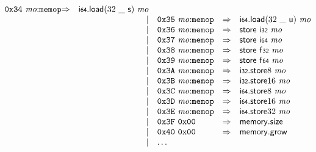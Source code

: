 $$\begin{array}{@{}l@{}rrlll@{}l@{}}
\mathtt{0x34}~{\mathit{mo}}{:}{\mathtt{memop}} &\Rightarrow& {\mathsf{i{\scriptstyle64}}.\mathsf{load}}{(32~\mathsf{\_}~\mathsf{s})}~{\mathit{mo}} \\ &&|&
\mathtt{0x35}~{\mathit{mo}}{:}{\mathtt{memop}} &\Rightarrow& {\mathsf{i{\scriptstyle64}}.\mathsf{load}}{(32~\mathsf{\_}~\mathsf{u})}~{\mathit{mo}} \\ &&|&
\mathtt{0x36}~{\mathit{mo}}{:}{\mathtt{memop}} &\Rightarrow& \mathsf{store}~\mathsf{i{\scriptstyle32}}~{\mathit{mo}} \\ &&|&
\mathtt{0x37}~{\mathit{mo}}{:}{\mathtt{memop}} &\Rightarrow& \mathsf{store}~\mathsf{i{\scriptstyle64}}~{\mathit{mo}} \\ &&|&
\mathtt{0x38}~{\mathit{mo}}{:}{\mathtt{memop}} &\Rightarrow& \mathsf{store}~\mathsf{f{\scriptstyle32}}~{\mathit{mo}} \\ &&|&
\mathtt{0x39}~{\mathit{mo}}{:}{\mathtt{memop}} &\Rightarrow& \mathsf{store}~\mathsf{f{\scriptstyle64}}~{\mathit{mo}} \\ &&|&
\mathtt{0x3A}~{\mathit{mo}}{:}{\mathtt{memop}} &\Rightarrow& {\mathsf{i{\scriptstyle32}}.\mathsf{store}}{8}~{\mathit{mo}} \\ &&|&
\mathtt{0x3B}~{\mathit{mo}}{:}{\mathtt{memop}} &\Rightarrow& {\mathsf{i{\scriptstyle32}}.\mathsf{store}}{16}~{\mathit{mo}} \\ &&|&
\mathtt{0x3C}~{\mathit{mo}}{:}{\mathtt{memop}} &\Rightarrow& {\mathsf{i{\scriptstyle64}}.\mathsf{store}}{8}~{\mathit{mo}} \\ &&|&
\mathtt{0x3D}~{\mathit{mo}}{:}{\mathtt{memop}} &\Rightarrow& {\mathsf{i{\scriptstyle64}}.\mathsf{store}}{16}~{\mathit{mo}} \\ &&|&
\mathtt{0x3E}~{\mathit{mo}}{:}{\mathtt{memop}} &\Rightarrow& {\mathsf{i{\scriptstyle64}}.\mathsf{store}}{32}~{\mathit{mo}} \\ &&|&
\mathtt{0x3F}~\mathtt{0x00} &\Rightarrow& \mathsf{memory.size} \\ &&|&
\mathtt{0x40}~\mathtt{0x00} &\Rightarrow& \mathsf{memory.grow} \\ &&|&
\dots \\
\end{array}
$$

\vspace{1ex}

